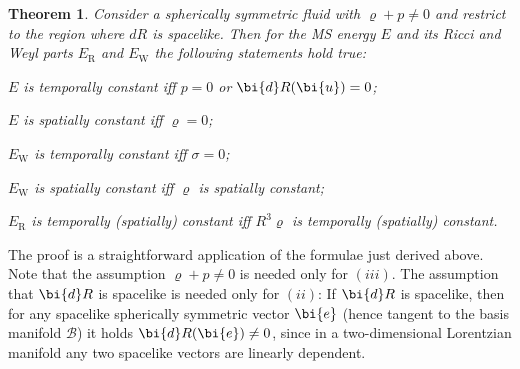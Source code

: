 \documentclass
[rmp,aps,twocolumn,showpacs,preprintnumbers,amsmath,amssymb]{revtex4}
\theoremstyle{plain}
\newtheorem{thm}{Theorem}
\theoremstyle{definition}
\theoremstyle{remark}
\newcommand{\sss}{\scriptscriptstyle}
\newcommand{\ind}[1]{{\sss \text{#1}}}        %
\newcommand{\ed}{\bi{d}}                      %
\newcommand{\B}{\mathcal{B}}                      %
\newcommand{\be}{\bi{e}}
\newcommand{\bu}{\bi{u}}
\begin{document}
\begin{thm}\label{thm:dE-vanishing}
Consider a spherically symmetric fluid with $\varrho+p \neq 0$ and restrict 
to the region where $dR$ is spacelike. Then for the MS energy $E$ and 
its Ricci and Weyl parts $E_\ind{R}$ and $E_\ind{W}$ the following 
statements hold true:
%
\begin{compactenum}[(i)]
\item $E$ is temporally constant iff $p=0$ or $\ed R(\bu)=0$; 
\item $E$ is spatially constant iff $\varrho=0$;
\item $E_\ind{W}$ is temporally constant iff $\sigma=0$;
\item $E_\ind{W}$ is spatially constant iff $\varrho$ is spatially constant;
\item $E_\ind{R}$ is temporally (spatially) constant iff $R^3\varrho$ is 
      temporally (spatially) constant.
\end{compactenum}
%
\end{thm}

\noindent
The proof is a straightforward application of the formulae just derived above.
Note that the assumption $\varrho+p \neq 0$ is needed only for $(iii)$. 
The assumption that $\ed R$ is spacelike is needed only for $(ii)$: If 
$\ed R$ is spacelike, then for any spacelike spherically symmetric vector 
$\be$ (hence tangent to the basis manifold $\B$) it holds 
$\ed R(\be) \neq 0$, since in a two-dimensional Lorentzian manifold any 
two spacelike vectors are linearly dependent. 






\end{document}
